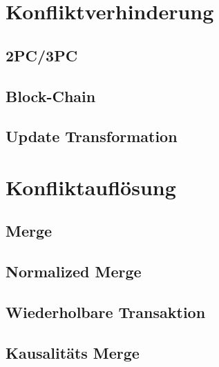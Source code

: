 \documentclass[oneside,11pt,parskip=half,ngerman]{scrreprt}
\begin{document}
\section{Konfliktverhinderung}\label{konfliktverhinderung}

\subsection{2PC/3PC}\label{pc3pc}

\subsection{Block-Chain}\label{block-chain-1}

\subsection{Update Transformation}\label{update-transformation}

\section{Konfliktauflösung}\label{konfliktaufluxf6sung}

\subsection{Merge}\label{merge}

\subsection{Normalized Merge}\label{normalized-merge}

\subsection{Wiederholbare Transaktion}\label{wiederholbare-transaktion}

\subsection{Kausalitäts Merge}\label{kausalituxe4ts-merge}
\end{document}
